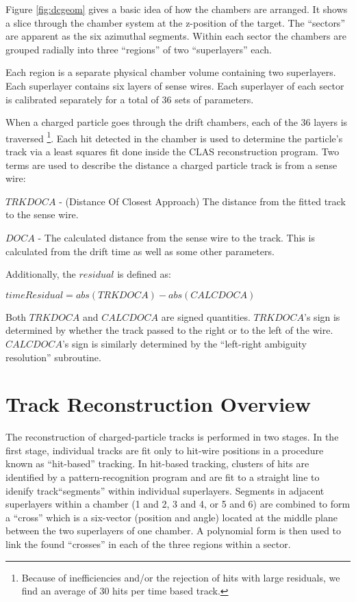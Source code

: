 \documentclass{article}
\begin{document}
Figure \ref{fig:dcgeom} gives a basic idea of
how the chambers are arranged. 
It shows a slice through the chamber system at the z-position of the
target.  The ``sectors'' are apparent as the six azimuthal segments.  Within
each sector the chambers are grouped radially into three ``regions'' of two
``superlayers'' each.


	
Each region is a separate physical chamber volume containing
two superlayers. Each superlayer contains six layers of sense wires. 
Each superlayer of each sector is calibrated separately for a
total of 36 sets of parameters.

When a charged particle goes through the drift chambers, each
of the 36 layers is traversed
\footnote{Because of inefficiencies and/or the rejection of hits with large
residuals, we find an average of 30 hits per time based
track.}.
Each hit detected in the chamber is used to determine the particle's
track via a least squares fit done inside the CLAS reconstruction 
program.  Two terms are used to describe
the distance a charged particle track is from a sense wire:

$TRKDOCA$ - (Distance Of Closest Approach) The distance from the fitted
track to the sense wire.

$DOCA$ - The calculated distance from the sense wire to the track. This
is calculated from the drift time as well as some other parameters.

\noindent
Additionally, the $residual$ is defined as:

$timeResidual=abs(TRKDOCA)-abs(CALCDOCA)$


Both $TRKDOCA$ and $CALCDOCA$ are signed quantities.
$TRKDOCA$'s sign is determined by whether the track passed
to the right or to the left of the wire.  $CALCDOCA$'s sign is similarly 
determined by the ``left-right ambiguity resolution'' subroutine.



\section{Track Reconstruction Overview}

The reconstruction of charged-particle tracks is performed in two stages.  In 
the first stage, individual tracks are fit only to hit-wire positions in a 
procedure known as ``hit-based'' tracking.  In hit-based tracking, clusters
of hits are identified by a pattern-recognition program and are fit to a straight line
to idenify track``segments'' within individual superlayers. Segments in adjacent
superlayers within a chamber (1 and 2, 3 and 4, or 5 and 6)
are combined to form a ``cross'' which is a six-vector 
(position and angle) located at the middle plane between the two superlayers
of one chamber.  A polynomial form is then used to link the found ``crosses'' in
each of the three regions within a sector. 
\end{document}
